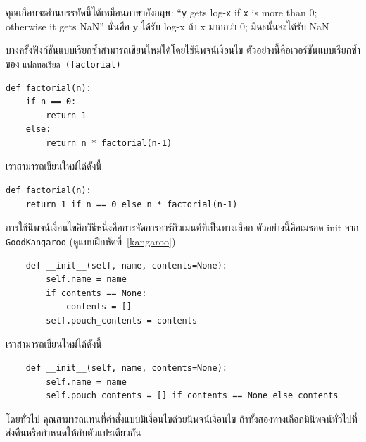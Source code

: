 คุณเกือบจะอ่านบรรทัดนี้ได้เหมือนภาษาอังกฤษ: ``{\tt y} gets log-{\tt x} if {\tt x} is more than 0; 
otherwise it gets NaN'' นั่นคือ y ได้รับ log-x ถ้า x มากกว่า 0; มิฉะนั้นจะได้รับ NaN 


บางครั้งฟังก์ชันแบบเรียกซ้ำสามารถเขียนใหม่ได้โดยใช้นิพจน์เงื่อนไข ตัวอย่างนี้คือเวอร์ชันแบบเรียกซ้ำของ {\tt แฟกทอเรียล (factorial)}

\begin{verbatim}
def factorial(n):
    if n == 0:
        return 1
    else:
        return n * factorial(n-1)
\end{verbatim}

เราสามารถเขียนใหม่ได้ดังนี้

\begin{verbatim}
def factorial(n):
    return 1 if n == 0 else n * factorial(n-1)
\end{verbatim}

การใช้นิพจน์เงื่อนไขอีกวิธีหนึ่งคือการจัดการอาร์กิวเมนต์ที่เป็นทางเลือก ตัวอย่างนี้คือเมธอด init จาก {\tt GoodKangaroo} (ดูแบบฝึกหัดที่~\ref{kangaroo})

\begin{verbatim}
    def __init__(self, name, contents=None):
        self.name = name
        if contents == None:
            contents = []
        self.pouch_contents = contents
\end{verbatim}

เราสามารถเขียนใหม่ได้ดังนี้

\begin{verbatim}
    def __init__(self, name, contents=None):
        self.name = name
        self.pouch_contents = [] if contents == None else contents 
\end{verbatim}

โดยทั่วไป คุณสามารถแทนที่คำสั่งแบบมีเงื่อนไขด้วยนิพจน์เงื่อนไข ถ้าทั้งสองทางเลือกมีนิพจน์ทั่วไปที่ส่งคืนหรือกำหนดให้กับตัวแปรเดียวกัน



